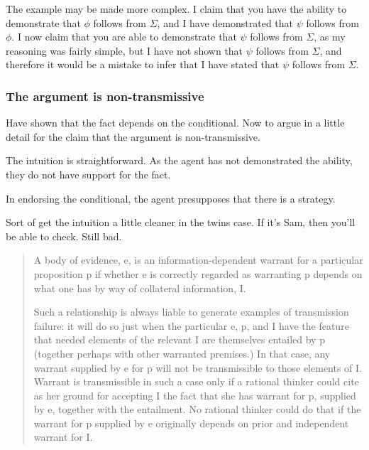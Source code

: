 \documentclass[10pt]{article}
\begin{document}
\begin{note}
  \begin{enumerate*}[label=(\roman*)]
  \item The example may be made more complex.
    I claim that you have the ability to demonstrate that \(\phi\) follows from \(\Sigma\), and I have demonstrated that \(\psi\) follows from \(\phi\).
    I now claim that you are able to demonstrate that \(\psi\) follows from \(\Sigma\), as my reasoning was fairly simple, but I have not shown that \(\psi\) follows from \(\Sigma\), and therefore it would be a mistake to infer that I have stated that \(\psi\) follows from \(\Sigma\).
  \end{enumerate*}
\end{note}

\newpage

\subsubsection{The argument is non-transmissive}
\label{sec:argum-non-transm}

\begin{note}[Overview]
  Have shown that the fact depends on the conditional.
  Now to argue in a little detail for the claim that the argument is non-transmissive.
\end{note}

The intuition is straightforward.
As the agent has not demonstrated the ability, they do not have support for the fact.

In endorsing the conditional, the agent presupposes that there is a strategy.


Sort of get the intuition a little cleaner in the twins case.
If it's Sam, then you'll be able to check.
Still bad.


\begin{quote}
  A body of evidence, e, is an information-dependent warrant for a particular proposition p if whether e is correctly regarded as warranting p depends on what one has by way of collateral information, I.

  Such a relationship is always liable to generate examples of transmission failure:
  it will do so just when the particular e, p, and I have the feature that needed elements of the relevant I are themselves entailed by p (together perhaps with other warranted premises.)
  In that case, any warrant supplied by e for p will not be transmissible to those elements of I.
  Warrant is transmissible in such a case only if a rational thinker could cite as her ground for accepting I the fact that she has warrant for p, supplied by e, together with the entailment.
  No rational thinker could do that if the warrant for p supplied by e originally depends on prior and independent warrant for I.
\end{quote}
\end{document}
